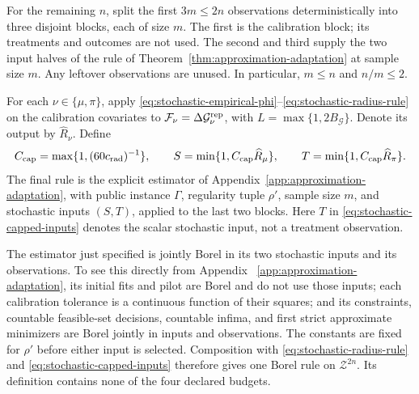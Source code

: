 For the remaining $n$, split the first $3m\le2n$ observations
deterministically into three disjoint blocks, each of size $m$.
The first is the calibration block; its treatments and outcomes
are not used. The second and third supply the two input halves of
the rule of Theorem~\ref{thm:approximation-adaptation} at sample
size $m$. Any leftover observations are unused. In particular,
$m\le n$ and $n/m\le2$.

For each $\nu\in\{\mu,\pi\}$, apply
\eqref{eq:stochastic-empirical-phi}--\eqref{eq:stochastic-radius-rule}
on the calibration covariates to
$\mathcal F_\nu=\Delta\mathcal G_\nu^{\rm rep}$, with
$L=\max\{1,2B_{\mathcal G}\}$. Denote its output by
$\widehat R_\nu$. Define
\begin{equation}
 C_{\rm cap}=\max\{1,(60c_{\rm rad})^{-1}\},\qquad
 S=\min\{1,C_{\rm cap}\widehat R_\mu\},\qquad
 T=\min\{1,C_{\rm cap}\widehat R_\pi\}.
 \label{eq:stochastic-capped-inputs}
\end{equation}
The final rule is the explicit estimator of
Appendix~\ref{app:approximation-adaptation}, with public instance
$\Gamma$, regularity tuple $\rho'$, sample size $m$, and stochastic
inputs $(S,T)$, applied to the last two blocks. Here $T$ in
\eqref{eq:stochastic-capped-inputs} denotes the scalar stochastic
input, not a treatment observation.

The estimator just specified is jointly Borel in its two stochastic
inputs and its observations. To see this directly from Appendix~
\ref{app:approximation-adaptation}, its initial fits and pilot are
Borel and do not use those inputs; each calibration tolerance is a
continuous function of their squares; and its constraints, countable
feasible-set decisions, countable infima, and first strict approximate
minimizers are Borel jointly in inputs and observations. The constants
are fixed for $\rho'$ before either input is selected. Composition
with \eqref{eq:stochastic-radius-rule} and
\eqref{eq:stochastic-capped-inputs} therefore gives one Borel rule
on $\mathcal Z^{2n}$. Its definition contains none of the four
declared budgets.

